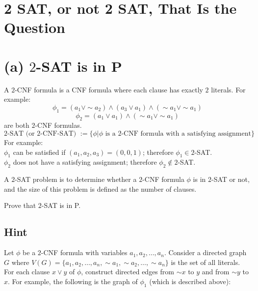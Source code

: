 
\section{2 SAT, or not 2 SAT, That Is the Question}

\section*{(a) $2$-SAT is in P}

A $2$-CNF formula is a CNF formula where each clause has exactly $2$ literals. For example: $$\phi_1=(a_1\lor\sim a_2)\land(a_3\lor a_1)\land(\sim a_1\lor\sim a_1)$$
$$\phi_2=(a_1\lor a_1)\land(\sim a_1\lor\sim a_1)$$
are both $2$-CNF formulas.
$$2\text{-SAT (or }2\text{-CNF-SAT) }:=\{\phi|\phi\text{ is a }2\text{-CNF formula with a satisfying assignment}\}$$ For example:\\
$\phi_1$ can be satisfied if $(a_1, a_2, a_3)=(0, 0, 1)$; therefore $\phi_1\in2$-SAT.\\
$\phi_2$ does not have a satisfying assignment; therefore $\phi_2\notin2$-SAT.

A $2$-SAT problem is to determine whether a $2$-CNF formula $\phi$ is in $2$-SAT or not, and the size of this problem is defined as the number of clauses.

Prove that $2$-SAT is in P.

\subsection*{Hint}

Let $\phi$ be a $2$-CNF formula with variables $a_1, a_2, \dots, a_n$. Consider a directed graph $G$ where $V(G)=\{a_1, a_2, \dots, a_n, \sim a_1, \sim a_2, \dots, \sim a_n\}$ is the set of all literals. For each clause $x\lor y$ of $\phi$, construct directed edges from $\sim x$ to $y$ and from $\sim y$ to $x$. For example, the following is the graph of $\phi_1$ (which is described above):


